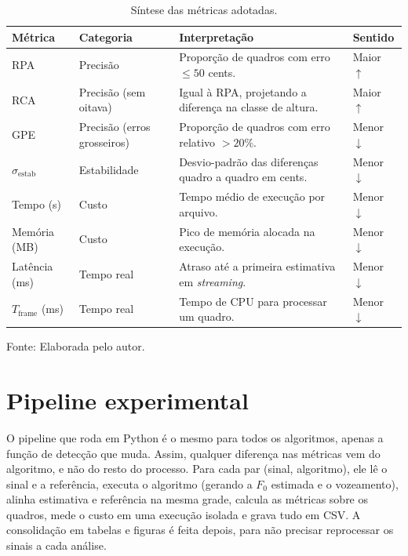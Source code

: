 \begin{table}[H]
\centering
\caption{\label{tab:metricas_resumo}Síntese das métricas adotadas.}
\small
\begin{tabular}{|p{3.2cm}|p{2.6cm}|p{6.6cm}|p{1.6cm}|}
\hline
\textbf{Métrica} & \textbf{Categoria} & \textbf{Interpretação} & \textbf{Sentido} \\
\hline
RPA & Precisão & Proporção de quadros com erro $\leq 50$ cents. & Maior $\uparrow$ \\
\hline
RCA & Precisão (sem oitava) & Igual à RPA, projetando a diferença na classe de altura. & Maior $\uparrow$ \\
\hline
GPE & Precisão (erros grosseiros) & Proporção de quadros com erro relativo $> 20\%$. & Menor $\downarrow$ \\
\hline
$\sigma_{\text{estab}}$ & Estabilidade & Desvio-padrão das diferenças quadro a quadro em cents. & Menor $\downarrow$ \\
\hline
Tempo (s) & Custo & Tempo médio de execução por arquivo. & Menor $\downarrow$ \\
\hline
Memória (MB) & Custo & Pico de memória alocada na execução. & Menor $\downarrow$ \\
\hline
Latência (ms) & Tempo real & Atraso até a primeira estimativa em \textit{streaming}. & Menor $\downarrow$ \\
\hline
$T_{\text{frame}}$ (ms) & Tempo real & Tempo de CPU para processar um quadro. & Menor $\downarrow$ \\
\hline
\end{tabular}
\small Fonte: Elaborada pelo autor.
\end{table}

\section{Pipeline experimental}
\label{sec:pipeline_experimental}

O pipeline que roda em Python é o mesmo para todos os algoritmos, apenas a função de detecção que muda. Assim, qualquer diferença nas métricas vem do algoritmo, e não do resto do processo. Para cada par (sinal, algoritmo), ele lê o sinal e a referência, executa o algoritmo (gerando a $F_0$ estimada e o vozeamento), alinha estimativa e referência na mesma grade, calcula as métricas sobre os quadros, mede o custo em uma execução isolada e grava tudo em CSV. A consolidação em tabelas e figuras é feita depois, para não precisar reprocessar os sinais a cada análise.

